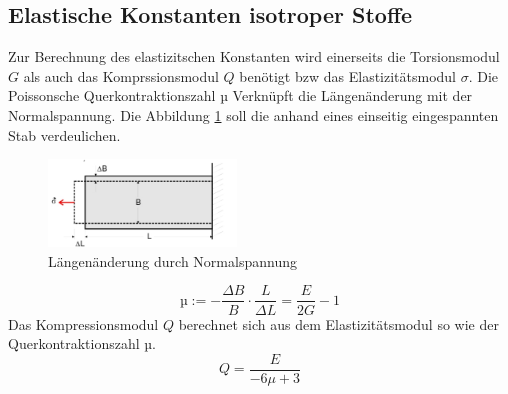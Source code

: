 \subsection{Elastische Konstanten isotroper Stoffe}
Zur Berechnung des elastizitschen Konstanten wird einerseits die Torsionsmodul $G$ als auch das Komprssionsmodul $Q$ benötigt bzw das Elastizitätsmodul $\sigma$.
Die Poissonsche Querkontraktionszahl µ Verknüpft die Längenänderung mit der Normalspannung. Die Abbildung \ref{fig:poisson} soll die anhand eines einseitig eingespannten Stab verdeulichen.
\begin{figure}
  \centering
  \includegraphics[width=5.0cm]{./picture/poisson.png}
  \caption{Längenänderung durch Normalspannung}
  \label{fig:poisson}
\end{figure}
\begin{equation}
  \text{µ} := -\frac{\Delta B}{B} \cdot \frac{L}{\Delta L} = \frac{E}{2G} - 1
  \label{eqn:pois}
\end{equation}
Das Kompressionsmodul $Q$ berechnet sich aus dem Elastizitätsmodul so wie der Querkontraktionszahl µ.
\begin{equation}
  Q = \frac{E}{-6 \mu + 3}
  \label{eqn:komp}
\end{equation}

